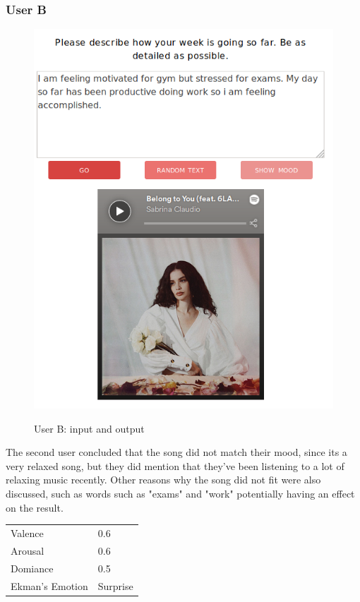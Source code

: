 \subsubsection{User B}

\begin{figure}[ht]
\caption{User B: input and output}
\centering
\includegraphics[scale=0.4]{implementation/jana.png}
\label{user:2}
\end{figure}

The second user concluded that the song did not match their mood, since its a very relaxed song, but they did mention that they've been listening to a lot of relaxing music recently. Other reasons why the song did not fit were also discussed, such as words such as "exams" and "work" potentially having an effect on the result.

\begin{table}[h]
\centering
\begin{tabular}{|l|l|}
\hline

 Valence &  0.6\\
 Arousal &  0.6\\
 Domiance &  0.5\\
 Ekman's Emotion &  Surprise\\ \hline
\end{tabular}
\end{table}

